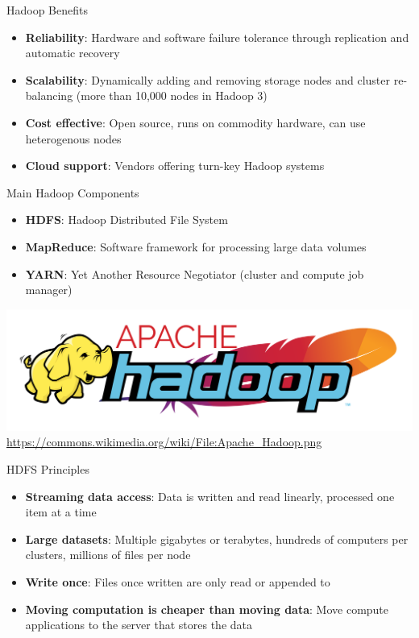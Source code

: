 \documentclass[ignorenonframetext,xcolor=x11names]{beamer}
\begin{document}
\begin{frame}{Hadoop Benefits}
\begin{itemize}
  \item \textbf{Reliability}: Hardware and software failure tolerance through replication and automatic recovery
  \item \textbf{Scalability}: Dynamically adding and removing storage nodes and cluster re-balancing (more than 10,000 nodes in Hadoop 3)
  \item \textbf{Cost effective}: Open source, runs on commodity hardware, can use heterogenous nodes
  \item \textbf{Cloud support}: Vendors offering turn-key Hadoop systems
\end{itemize}
\end{frame}

\begin{frame}{Main Hadoop Components}
\begin{itemize}
    \item \textbf{HDFS}: Hadoop Distributed File System
    \item \textbf{MapReduce}: Software framework for processing large data volumes
    \item \textbf{YARN}: Yet Another Resource Negotiator (cluster and compute job manager)
\end{itemize}

\centering
\vspace{2\baselineskip}
\includegraphics[width=.8\textwidth]{Apache_Hadoop.png}
\scriptsize \url{https://commons.wikimedia.org/wiki/File:Apache_Hadoop.png}
\end{frame}

\begin{frame}{HDFS Principles}
\begin{itemize}
   \item \textbf{Streaming data access}: Data is written and read linearly, processed one item at a time
   \item \textbf{Large datasets}: Multiple gigabytes or terabytes, hundreds of computers per clusters, millions of files per node
   \item \textbf{Write once}: Files once written are only read or appended to
   \item \textbf{Moving computation is cheaper than moving data}: Move compute applications to the server that stores the data
\end{itemize}
\end{frame}
\end{document}
